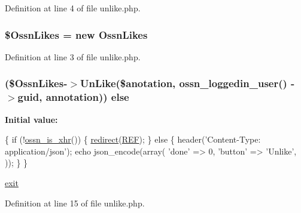 Definition at line 4 of file unlike.\+php.

\subsubsection[{\texorpdfstring{\$\+Ossn\+Likes}{$OssnLikes}}]{\setlength{\rightskip}{0pt plus 5cm}\${\bf Ossn\+Likes} = new {\bf Ossn\+Likes}}\hypertarget{annotation_2unlike_8php_a227f36ff099a95468945a2fabc5c0782}{}\label{annotation_2unlike_8php_a227f36ff099a95468945a2fabc5c0782}


Definition at line 3 of file unlike.\+php.

\subsubsection[{\texorpdfstring{else}{else}}]{ (\${\bf Ossn\+Likes}-\/$>$Un\+Like(\$anotation, {\bf ossn\+\_\+loggedin\+\_\+user}() -\/$>$guid, \textquotesingle{}annotation\textquotesingle{})) else}\hypertarget{annotation_2unlike_8php_accf6dc8978a602e292ced6a3501735b5}{}\label{annotation_2unlike_8php_accf6dc8978a602e292ced6a3501735b5}
{\bfseries Initial value\+:}
\begin{DoxyCode}
\{
    \textcolor{keywordflow}{if} (!\hyperlink{ossn_8lib_8system_8php_ac764e738f5c840432bbe4771e4fa27a7}{ossn\_is\_xhr}()) \{
        \hyperlink{ossn_8lib_8system_8php_a33cafdb93398ec540993c12c1daa0c48}{redirect}(\hyperlink{ossn_8lib_8system_8php_a6141904c50990cdd468f07046f29bb5c}{REF});
    \} \textcolor{keywordflow}{else} \{
        header(\textcolor{stringliteral}{'Content-Type: application/json'});
        echo json\_encode(array(
                \textcolor{stringliteral}{'done'} => 0,
                \textcolor{stringliteral}{'button'} => \textcolor{stringliteral}{'Unlike'},
            ));
    \}
\}

\hyperlink{register_8php_a6733eb5f605d09eaede9845835d71c4e}{exit}
\end{DoxyCode}


Definition at line 15 of file unlike.\+php.

